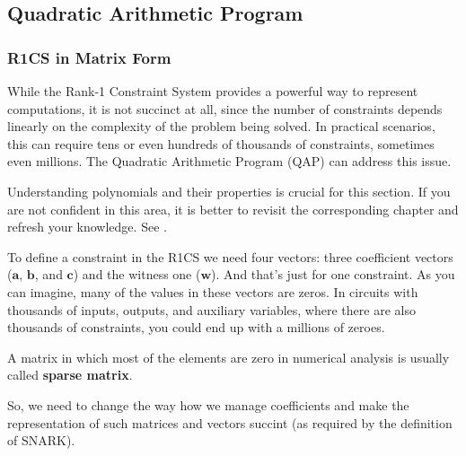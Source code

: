\documentclass[../lecture-notes.tex]{subfiles}
\begin{document}
\subsection{Quadratic Arithmetic Program}
\subsubsection{R1CS in Matrix Form}

While the Rank-1 Constraint System provides a powerful way to represent computations, it is not 
succinct at all, since the number of constraints depends linearly on the complexity of the problem 
being solved. In practical scenarios, this can require tens or even hundreds of thousands of 
constraints, sometimes even millions. The Quadratic Arithmetic Program (QAP) can address this issue.

\begin{remark}
    Understanding polynomials and their properties is crucial for this section. If you are not 
    confident in this area, it is better to revisit the corresponding chapter and refresh your
    knowledge. See .
\end{remark}

To define a constraint in the R1CS we need four vectors: three coefficient vectors ($\mathbf{a}$, $\mathbf{b}$, and
$\mathbf{c}$) and the witness one ($\mathbf{w}$). And that's just for one constraint. As you can imagine, many of
the values in these vectors are zeros. In circuits with thousands of inputs, outputs, and auxiliary
variables, where there are also thousands of constraints, you could end up with a millions of zeroes.
\begin{remark}
    A matrix in which most of the elements are zero in numerical analysis is usually called \textbf{sparse
    matrix}.
\end{remark}

So, we need to change the way how we manage coefficients and make the representation of such matrices and vectors succint (as required by the definition of SNARK).
\end{document}
